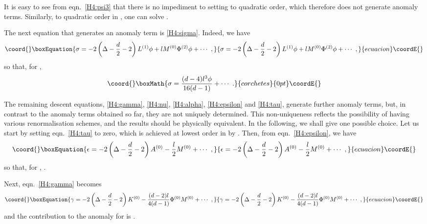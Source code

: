 \documentclass[a4paper,12pt]{article}
\begin{document}
It is easy to see from eqn.\ \eqref{H4:psi3} that there is no
impediment to setting \coordHE{} to quadratic order, which therefore
does not generate anomaly terms. Similarly, to quadratic order in
\myHighlight{$\phi$}\coordHE{}, one can solve \coordHE{}. 

The next equation that generates an anomaly term is
\eqref{H4:sigma}. Indeed, we have 
\begin{equation}\coord{}\boxEquation{
\label{perturb:sigma}
  \sigma = -2 \left( \Delta-\frac{d}2-2\right) L^{(1)}\phi 
  + l M^{(0)} \Phi^{(2)} \phi +\cdots~, 
}{
\sigma = -2 \left( \Delta-\frac{d}2-2\right) L^{(1)}\phi 
  + l M^{(0)} \Phi^{(2)} \phi +\cdots~, 
}{ecuacion}\coordE{}\end{equation}
so that, for \coordHE{}, 
\[\coord{}\boxMath{ \sigma = \frac{(d-4) l^3 \phi}{16(d-1)} + \cdots~.}{corchetes}{0pt}\coordE{}\]

The remaining descent equations, \eqref{H4:gamma}, \eqref{H4:nu},
\eqref{H4:alpha}, \eqref{H4:epsilon} and \eqref{H4:tau}, generate
further anomaly terms, but, in contrast to the anomaly terms obtained
so far, they are not uniquely determined. This non-uniqueness reflects
the possibility of having various renormalisation schemes, and the
results should be physically equivalent. In the following, we shall
give one possible choice. Let us start by setting eqn.\ \eqref{H4:tau}
to zero, which is achieved at lowest order in \myHighlight{$\phi$}\coordHE{} by \coordHE{}. Then, from eqn.\ \eqref{H4:epsilon}, we have 
\begin{equation}\coord{}\boxEquation{
\label{perturb:epsilon}
  \epsilon = -2 \left( \Delta- \frac{d}2 -2\right) A^{(0)} -\frac{l}2
  M^{(0)}+\cdots~, 
}{
\epsilon = -2 \left( \Delta- \frac{d}2 -2\right) A^{(0)} -\frac{l}2
  M^{(0)}+\cdots~, 
}{ecuacion}\coordE{}\end{equation}
so that, for \coordHE{}, \coordHE{}. 

Next, eqn.\ \eqref{H4:gamma} becomes
\begin{equation}\coord{}\boxEquation{
\label{perturb:gamma}
  \gamma = -2 \left( \Delta- \frac{d}2 -2\right) K^{(0)} -
  \frac{(d-2)l}{4(d-1)} \Phi^{(0)} M^{(0)} +\cdots~, 
}{
\gamma = -2 \left( \Delta- \frac{d}2 -2\right) K^{(0)} -
  \frac{(d-2)l}{4(d-1)} \Phi^{(0)} M^{(0)} +\cdots~, 
}{ecuacion}\coordE{}\end{equation}
and the contribution to the anomaly for \coordHE{} is
\coordHE{}. 
\end{document}

